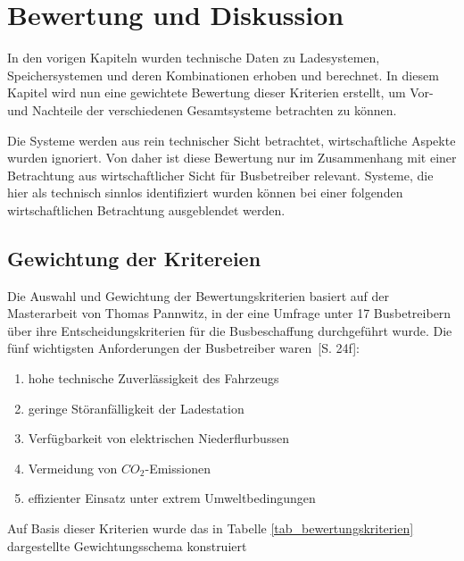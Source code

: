 \chapter{Bewertung und Diskussion} %
In den vorigen Kapiteln wurden technische Daten zu Ladesystemen, Speichersystemen und deren Kombinationen erhoben und berechnet. In diesem Kapitel wird nun eine gewichtete Bewertung dieser Kriterien erstellt, um Vor- und Nachteile der verschiedenen Gesamtsysteme betrachten zu können.

Die Systeme werden aus rein technischer Sicht betrachtet, wirtschaftliche Aspekte wurden ignoriert. Von daher ist diese Bewertung nur im Zusammenhang mit einer Betrachtung aus wirtschaftlicher Sicht für Busbetreiber relevant. Systeme, die hier als technisch sinnlos identifiziert wurden können bei einer folgenden wirtschaftlichen Betrachtung ausgeblendet werden.

\section{Gewichtung der Kritereien}
Die Auswahl und Gewichtung der Bewertungskriterien basiert auf der Masterarbeit von Thomas Pannwitz, in der eine Umfrage unter 17 Busbetreibern über ihre Entscheidungskriterien für die Busbeschaffung durchgeführt wurde. Die fünf wichtigsten Anforderungen der Busbetreiber waren~\cite{pannwitz2014}[S. 24f]:
\begin{enumerate}
	\item hohe technische Zuverlässigkeit des Fahrzeugs
	\item geringe Störanfälligkeit der Ladestation
	\item Verfügbarkeit von elektrischen Niederflurbussen
	\item Vermeidung von $CO_2$-Emissionen
	\item effizienter Einsatz unter extrem Umweltbedingungen
\end{enumerate}

Auf Basis dieser Kriterien wurde das in Tabelle \ref{tab_bewertungskriterien} dargestellte Gewichtungsschema konstruiert



